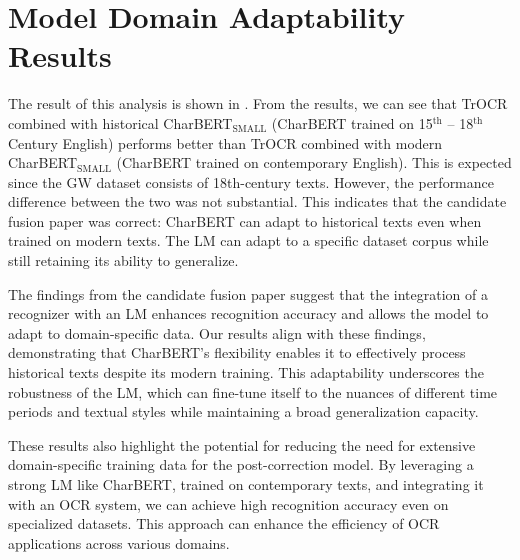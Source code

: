 \section{Model Domain Adaptability Results}
\label{sec:5_model_domain_adaptability_results}
The result of this analysis is shown in . From the results, we can see that TrOCR combined with historical CharBERT$_{\text{SMALL}}$ (CharBERT trained on 15$^{\text{th}}$ -- 18$^{\text{th}}$ Century English) performs better than TrOCR combined with modern CharBERT$_{\text{SMALL}}$ (CharBERT trained on contemporary English). This is expected since the GW dataset consists of 18th-century texts. However, the performance difference between the two was not substantial. This indicates that the candidate fusion paper was correct: CharBERT can adapt to historical texts even when trained on modern texts. The LM can adapt to a specific dataset corpus while still retaining its ability to generalize.

The findings from the candidate fusion paper suggest that the integration of a recognizer with an LM enhances recognition accuracy and allows the model to adapt to domain-specific data. Our results align with these findings, demonstrating that CharBERT's flexibility enables it to effectively process historical texts despite its modern training. This adaptability underscores the robustness of the LM, which can fine-tune itself to the nuances of different time periods and textual styles while maintaining a broad generalization capacity. 

These results also highlight the potential for reducing the need for extensive domain-specific training data for the post-correction model. By leveraging a strong LM like CharBERT, trained on contemporary texts, and integrating it with an OCR system, we can achieve high recognition accuracy even on specialized datasets. This approach can enhance the efficiency of OCR applications across various domains.


